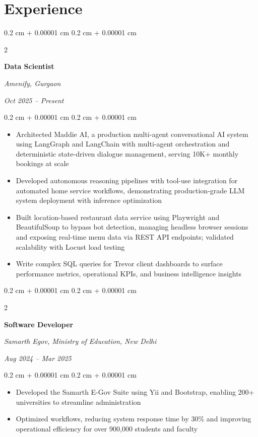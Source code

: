 \documentclass[10pt, letterpaper]{article}
\newenvironment{highlights}{
    \begin{itemize}[
        topsep=0.10 cm,
        parsep=0.10 cm,
        partopsep=0pt,
        itemsep=0pt,
        leftmargin=0.4 cm + 10pt
    ]
}{
    \end{itemize}
}
\newenvironment{onecolentry}{
    \begin{adjustwidth}{
        0.2 cm + 0.00001 cm
    }{
        0.2 cm + 0.00001 cm
    }
}{
    \end{adjustwidth}
}
\newenvironment{twocolentry}[2][]{
    \onecolentry
    \def\secondColumn{#2}
    \setcolumnwidth{\fill, 4.5 cm}
    \begin{paracol}{2}
}{
    \switchcolumn \raggedleft \secondColumn
    \end{paracol}
    \endonecolentry
}
\begin{document}
    \section{Experience}

        \vspace{0.2 cm}

        \begin{twocolentry}{\textit{Oct 2025 – Present}}
            \textbf{Data Scientist}
            
            \textit{Amenify, Gurgaon}
        \end{twocolentry}
        
        \vspace{0.10 cm}
        \begin{onecolentry}
            \begin{highlights}
                \item Architected Maddie AI, a production multi-agent conversational AI system using LangGraph and LangChain with multi-agent orchestration and deterministic state-driven dialogue management, serving 10K+ monthly bookings at scale
                \item Developed autonomous reasoning pipelines with tool-use integration for automated home service workflows, demonstrating production-grade LLM system deployment with inference optimization
                \item Built location-based restaurant data service using Playwright and BeautifulSoup to bypass bot detection, managing headless browser sessions and exposing real-time menu data via REST API endpoints; validated scalability with Locust load testing
                \item Write complex SQL queries for Trevor client dashboards to surface performance metrics, operational KPIs, and business intelligence insights
            \end{highlights}
        \end{onecolentry}

        \vspace{0.2 cm}

        \begin{twocolentry}{\textit{Aug 2024 – Mar 2025}}
            \textbf{Software Developer}
            
            \textit{Samarth Egov, Ministry of Education, New Delhi}
        \end{twocolentry}

        \vspace{0.10 cm}
        \begin{onecolentry}
            \begin{highlights}  
                 \item Developed the Samarth E-Gov Suite using Yii and Bootstrap, enabling 200+ universities to streamline administration
                \item Optimized workflows, reducing system response time by 30\% and improving operational efficiency for over 900,000 students and faculty  
            \end{highlights}
        \end{onecolentry}
\end{document}
